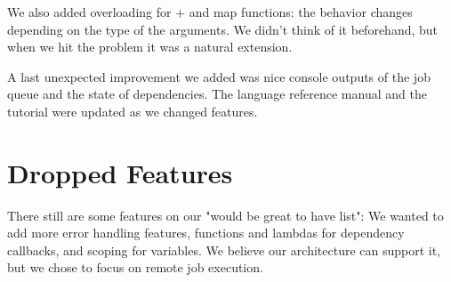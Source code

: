 We also added overloading for + and map functions: the behavior changes depending on the type of the arguments.
We didn't think of it beforehand, but when we hit the problem it was a natural extension.

A last unexpected improvement we added was nice console outputs of the job queue and the state of dependencies.
The language reference manual and the tutorial were updated as we changed features.

\section{Dropped Features}

There still are some features on our "would be great to have list":
We wanted to add more error handling features, functions and lambdas for dependency callbacks, and scoping for variables.
We believe our architecture can support it, but we chose to focus on remote job execution.

